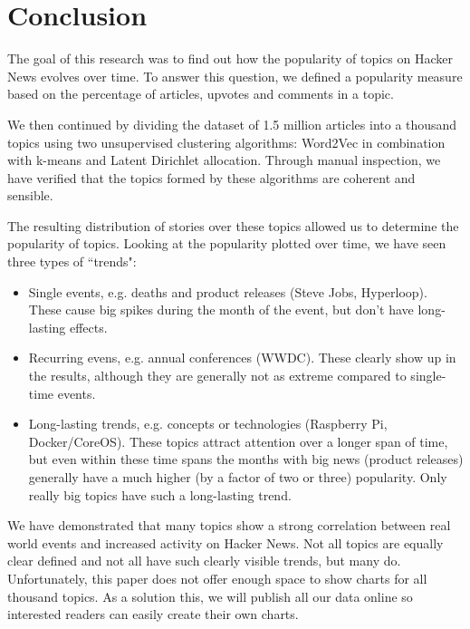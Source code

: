 \section{Conclusion}
The goal of this research was to find out how the popularity of topics on Hacker News evolves over time. To answer this question, we defined a popularity measure based on the percentage of articles, upvotes and comments in a topic.

We then continued by dividing the dataset of 1.5 million articles into a thousand topics using two unsupervised clustering algorithms: Word2Vec in combination with k-means and Latent Dirichlet allocation. Through manual inspection, we have verified that the topics formed by these algorithms are coherent and sensible.

The resulting distribution of stories over these topics allowed us to determine the popularity of topics. Looking at the popularity plotted over time, we have seen three types of ``trends":
\begin{itemize}
\item Single events, e.g. deaths and product releases (Steve Jobs, Hyperloop). These cause big spikes during the month of the event, but don't have long-lasting effects.
\item Recurring evens, e.g. annual conferences (WWDC). These clearly show up in the results, although they are generally not as extreme compared to single-time events.
\item Long-lasting trends, e.g. concepts or technologies (Raspberry Pi, Docker/CoreOS). These topics attract attention over a longer span of time, but even within these time spans the months with big news (product releases) generally have a much higher (by a factor of two or three) popularity. Only really big topics have such a long-lasting trend.
\end{itemize}

We have demonstrated that many topics show a strong correlation between real world events and increased activity on Hacker News. Not all topics are equally clear defined and not all have such clearly visible trends, but many do. Unfortunately, this paper does not offer enough space to show charts for all thousand topics. As a solution this, we will publish all our data online so interested readers can easily create their own charts.
